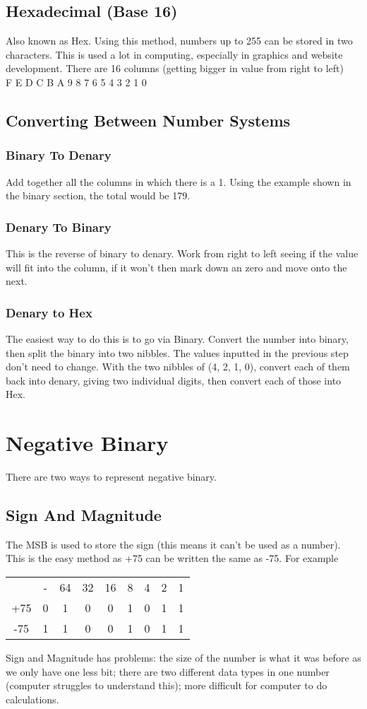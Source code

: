 \documentclass[a4paper,11pt, twocolumn]{article}
\begin{document}
\subsection{Hexadecimal (Base 16)}
Also known as Hex. Using this method, numbers up to 255 can be stored in two characters. This is used a lot in computing, especially in graphics and website development. There are 16 columns (getting bigger in value from right to left)\\
F E D C B A 9 8 7 6 5 4 3 2 1 0 
\subsection{Converting Between Number Systems}
\subsubsection{Binary To Denary}
Add together all the columns in which there is a 1. Using the example shown in the binary section, the total would be 179.
\subsubsection{Denary To Binary}
This is the reverse of binary to denary. Work from right to left seeing if the value will fit into the column, if it won't then mark down an zero and move onto the next.
\subsubsection{Denary to Hex}
The easiest way to do this is to go via Binary. Convert the number into binary, then split the binary into two nibbles. The values inputted in the previous step don't need to change. With the two nibbles of (4, 2, 1, 0), convert each of them back into denary, giving two individual digits, then convert each of those into Hex. 

\section{Negative Binary}
There are two ways to represent negative binary.
\subsection{Sign And Magnitude}
The MSB is used to store the sign (this means it can't be used as a number). This is the easy method as +75 can be written the same as -75. For example
\begin{table}[H]
    \centering
    \begin{tabularx}{0.9\linewidth}{c | c c c c c c c c}
         & - & 64 & 32 & 16 & 8 & 4 & 2 & 1 \\
        +75 & 0 & 1 & 0 & 0 & 1 & 0 & 1 & 1 \\
        -75 & 1 & 1 & 0 & 0 & 1 & 0 & 1 & 1
    \end{tabularx}
\end{table}
\noindent Sign and Magnitude has problems: the size of the number is what it was before as we only have one less bit; there are two different data types in one number (computer struggles to understand this); more difficult for computer to do calculations. 
\end{document}
